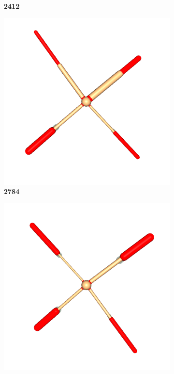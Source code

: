 \begin{figure}[!ht]
\begin{subfigure}{\textwidth}
\begin{minipage}{0.19\textwidth}
                    \textbf{2412}
                \end{minipage}
                \hfill
                \begin{minipage}{0.19\textwidth}
                    \centering
                    \includegraphics[width=\linewidth]{resources/generalist_4_2784/ant.png}
                    \textbf{2784}
                \end{minipage}
                \hfill
                \begin{minipage}{0.19\textwidth}
                    \centering
                    \includegraphics[width=\linewidth]{resources/generalist_1_2966/ant.png}

\end{minipage}
\end{subfigure}
\end{figure}
